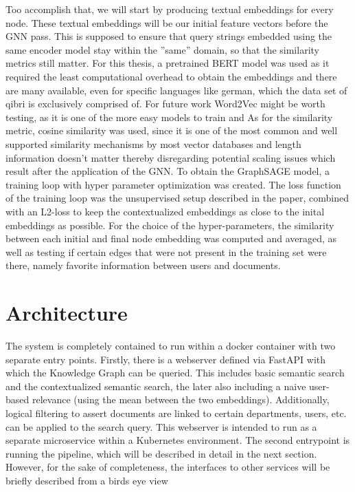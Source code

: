 \documentclass[draft,final]{vutinfth} %
\begin{document}
Too accomplish that, we will start by producing textual embeddings for every node. These textual embeddings will be our initial feature vectors before the GNN pass. This is supposed to ensure that query strings embedded using the same encoder model stay within the ''same'' domain, so that the similarity metrics still matter. For this thesis, a pretrained BERT model was used as it required the least computational overhead to obtain the embeddings and there are many available, even for specific languages like german, which the data set of qibri is exclusively comprised of. For future work Word2Vec might be worth testing, as it is one of the more easy models to train and As for the similarity metric, cosine similarity was used, since it is one of the most common and well supported similarity mechanisms by most vector databases and length information doesn't matter thereby disregarding potential scaling issues which result after the application of the GNN. To obtain the GraphSAGE model, a training loop with hyper parameter optimization was created. The loss function of the training loop was the unsupervised setup described in the paper, combined with an L2-loss to keep the contextualized embeddings as close to the inital embeddings as possible. For the choice of the hyper-parameters, the similarity between each initial and final node embedding was computed and averaged, as well as testing if certain edges that were not present in the training set were there, namely favorite information between users and documents.

\section{Architecture}
The system is completely contained to run within a docker container with two separate entry points. Firstly, there is a webserver defined via FastAPI with which the Knowledge Graph can be queried. This includes basic semantic search and the contextualized semantic search, the later also including a naive user-based relevance (using the mean between the two embeddings). Additionally, logical filtering to assert documents are linked to certain departments, users, etc. can be applied to the search query. This webserver is intended to run as a separate microservice within a Kubernetes environment.
The second entrypoint is running the pipeline, which will be described in detail in the next section. However, for the sake of completeness, the interfaces to other services will be briefly described from a birds eye view
\end{document}
